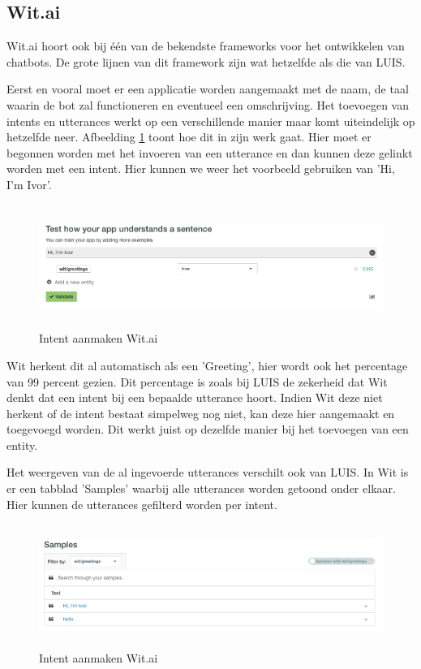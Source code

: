 \subsection{Wit.ai}
\label{Wit}

Wit.ai hoort ook bij één van de bekendste frameworks voor het ontwikkelen van chatbots. De grote lijnen van dit framework zijn wat hetzelfde als die van LUIS.

Eerst en vooral moet er een applicatie worden aangemaakt met de naam, de taal waarin de bot zal functioneren en eventueel een omschrijving. Het toevoegen van intents en utterances werkt op een verschillende manier maar komt uiteindelijk op hetzelfde neer. Afbeelding \ref{fig:intentsWit} toont hoe dit in zijn werk gaat. Hier moet er begonnen worden met het invoeren van een utterance en dan kunnen deze gelinkt worden met een intent. Hier kunnen we weer het voorbeeld gebruiken van 'Hi, I'm Ivor'.

\begin{figure}[h!]
	\centering
	\includegraphics[height=4cm]{img/wit_intents.png}
	\caption{Intent aanmaken Wit.ai}
	\label{fig:intentsWit}
\end{figure}

Wit herkent dit al automatisch als een 'Greeting', hier wordt ook het percentage van 99 percent gezien. Dit percentage is zoals bij LUIS de zekerheid dat Wit denkt dat een intent bij een bepaalde utterance hoort. Indien Wit deze niet herkent of de intent bestaat simpelweg nog niet, kan deze hier aangemaakt en toegevoegd worden. Dit werkt juist op dezelfde manier bij het toevoegen van een entity.

Het weergeven van de al ingevoerde utterances verschilt ook van LUIS. In Wit is er een tabblad 'Samples' waarbij alle utterances worden getoond onder elkaar. Hier kunnen de utterances gefilterd worden per intent.

\begin{figure}[h!]
	\centering
	\includegraphics[height=4cm]{img/samples.png}
	\caption{Intent aanmaken Wit.ai}
	\label{fig:samples}
\end{figure}

